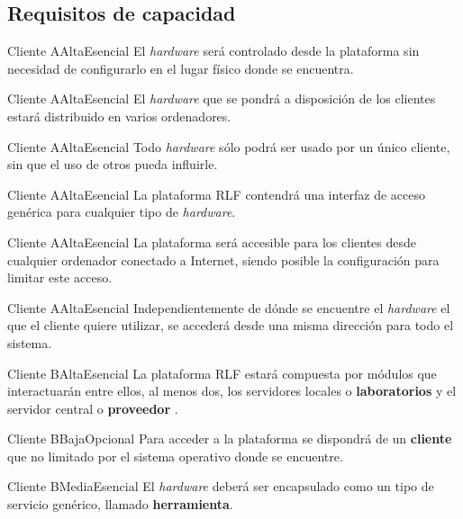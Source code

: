 

\subsection{Requisitos de capacidad}

{Cliente A}{Alta}{Esencial}
{
El \emph{hardware} será controlado desde la plataforma sin necesidad de 
configurarlo en el lugar físico donde se encuentra.
}

{Cliente A}{Alta}{Esencial}
{
El \emph{hardware} que se pondrá a disposición de los clientes estará 
distribuido en varios ordenadores.
}

{Cliente A}{Alta}{Esencial}
{
Todo \emph{hardware} sólo podrá ser usado por un único cliente, sin 
que el uso de otros pueda influirle.
}

{Cliente A}{Alta}{Esencial}
{
La plataforma RLF contendrá una interfaz de acceso genérica para 
cualquier tipo de \emph{hardware}.
}

{Cliente A}{Alta}{Esencial}
{
La plataforma será accesible para los clientes desde cualquier 
ordenador conectado a Internet, siendo posible la configuración para 
limitar este acceso.
}

{Cliente A}{Alta}{Esencial}
{
Independientemente de dónde se encuentre el \emph{hardware} el que el 
cliente quiere utilizar, se accederá desde una misma dirección para 
todo el sistema.
}

{Cliente B}{Alta}{Esencial}
{
La plataforma RLF estará compuesta por módulos que interactuarán entre 
ellos, al menos dos, los servidores locales o \textbf{laboratorios} 
 y el servidor central o \textbf{proveedor} 
.
}

{Cliente B}{Baja}{Opcional}
{
Para acceder a la plataforma se dispondrá de un \textbf{cliente} 
 que no limitado por el sistema operativo donde se 
encuentre.
}

{Cliente B}{Media}{Esencial}
{
El \emph{hardware} deberá ser encapsulado como un tipo de servicio 
genérico, llamado \textbf{herramienta}.
}

